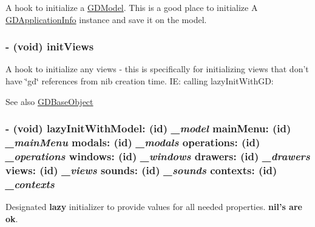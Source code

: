 A hook to initialize a \hyperlink{interface_g_d_model}{GDModel}. This is a good place to initialize A \hyperlink{interface_g_d_application_info}{GDApplicationInfo} instance and save it on the model. \hypertarget{interface_g_d_application_controller_aa966d71f7f1a9dea72eec302da43bf92}{
\subsubsection[{initViews}]{\setlength{\rightskip}{0pt plus 5cm}-\/ (void) initViews }}
\label{interface_g_d_application_controller_aa966d71f7f1a9dea72eec302da43bf92}


A hook to initialize any views -\/ this is specifically for initializing views that don't have \char`\"{}gd\char`\"{} references from nib creation time. IE: calling lazyInitWithGD:

\begin{DoxySeeAlso}{See also}
\hyperlink{interface_g_d_base_object}{GDBaseObject} 
\end{DoxySeeAlso}
\hypertarget{interface_g_d_application_controller_a2cbdfaa697915ca8b6ff10badce9d978}{
\subsubsection[{lazyInitWithModel:mainMenu:modals:operations:windows:drawers:views:sounds:contexts:}]{\setlength{\rightskip}{0pt plus 5cm}-\/ (void) lazyInitWithModel: (id) {\em \_\-model}\/ mainMenu: (id) {\em \_\-mainMenu}\/ modals: (id) {\em \_\-modals}\/ operations: (id) {\em \_\-operations}\/ windows: (id) {\em \_\-windows}\/ drawers: (id) {\em \_\-drawers}\/ views: (id) {\em \_\-views}\/ sounds: (id) {\em \_\-sounds}\/ contexts: (id) {\em \_\-contexts}}}
\label{interface_g_d_application_controller_a2cbdfaa697915ca8b6ff10badce9d978}


Designated {\bfseries lazy} initializer to provide values for all needed properties. {\bfseries nil's are ok}.

